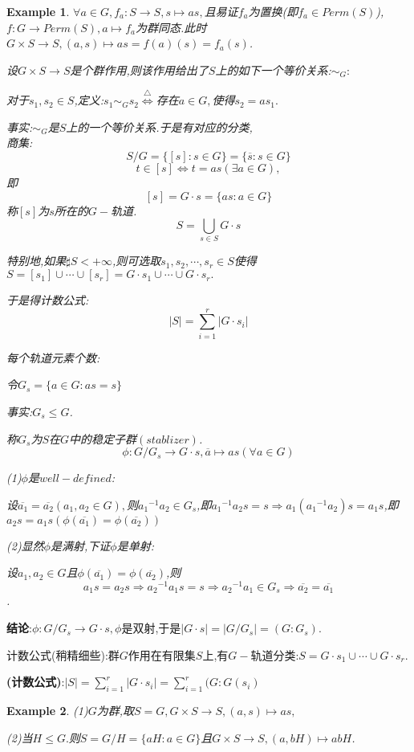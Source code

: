 \documentclass[UTF8]{article}
\newtheorem{exa}{Example}[section]
\begin{document}
\begin{exa}
	$\forall a\in G,f_a:S\to S,s\mapsto as,$且易证$f_a$为置换(即$f_a\in Perm(S)$),$f:G\to Perm(S),a\mapsto f_a$为群同态.此时$G\times S\rightarrow S,(a,s)\mapsto as=f(a)(s)=f_a(s)$.
	
	设$G\times S\rightarrow S$是个群作用,则该作用给出了$S$上的如下一个等价关系:$\sim_G:$
	
	对于$s_1,s_2\in S$,定义:$s_1\sim_G s_2\stackrel{\bigtriangleup}{\Longleftrightarrow}$存在$a\in G,$使得$s_2=as_1.$
	
	事实:$\sim_G$是$S$上的一个等价关系.于是有对应的分类,\\
	商集:$$S/G=\{[s]:s\in G\}=\{\overline s:s\in G\}$$
	$$t\in [s]\Leftrightarrow t=as(\exists a\in G),$$即
	$$[s]=G\cdot s=\{as:a\in G\}$$
	称$[s]$为$s$所在的$G-$轨道.
	$$S=\bigcup_{s\in S}G\cdot s$$
	
	特别地,如果$\sharp S<+\infty$,则可选取$s_1,s_2,\cdots,s_r\in S$使得$S=[s_1]\cup\cdots\cup[s_r]=G\cdot s_1\cup\cdots\cup G\cdot s_r.$
	
	于是得计数公式:$$|S|=\sum_{i=1}^r|G\cdot s_i|$$
	
	每个轨道元素个数:
	
	令$G_s=\{a\in G:as=s\}$
	
	事实:$G_s\le G$.
	
	称$G_s$为$S$在$G$中的稳定子群$(stablizer)$.
	$$\phi:G/G_s\to G\cdot s,\overline a\mapsto as(\forall a\in G)$$
	
	(1)$\phi$是$well-defined$:
	
	设$\overline {a_1}=\overline {a_2}(a_1,a_2\in G),$则${a_1}^{-1}{a_2}\in G_s$,即${a_1}^{-1}{a_2}s=s\Rightarrow{a_1}({a_1}^{-1}{a_2})s={a_1}s$,即${a_2}s={a_1}s(\phi(\overline {a_1})=\phi(\overline {a_2}))$
	
	(2)显然$\phi$是满射,下证$\phi$是单射:
	
	设$a_1,a_2\in G$且$\phi(\overline {a_1})=\phi(\overline {a_2})$,则
	$$a_1s=a_2s\Rightarrow {a_2}^{-1}{a_1}s=s\Rightarrow {a_2}^{-1}{a_1}\in G_s\Rightarrow \overline {a_2}=\overline {a_1}$$.
\end{exa}

\textbf{结论}:$\phi:G/G_s\to G\cdot s,\phi$是双射,于是$|G\cdot s|=|G/G_s|=(G:G_s)$.

计数公式(稍精细些):群$G$作用在有限集$S$上,有$G-$轨道分类:$S=G\cdot s_1\cup\cdots\cup G\cdot s_r.$

\textbf{(计数公式)}:$|S|=\sum_{i=1}^r|G\cdot s_i|=\sum_{i=1}^r(G: G{(s_i)}$

\begin{exa}
	
	(1)$G$为群,取$S=G,G\times S\rightarrow S,(a,s)\mapsto as,$
	
	(2)当$H\le G.$则$S=G/H=\{aH:a\in G\}$且$G\times S\rightarrow S,(a,bH)\mapsto abH$.
\end{exa}
\end{document}
